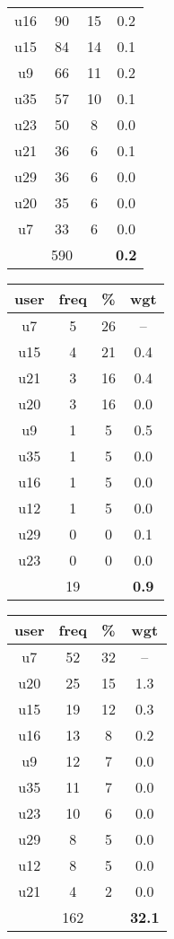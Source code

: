 \begin{appendices}
\begin{table}
\begin{tabular}{ |c|c|c|c| }
	u16 & 90 & 15 & 0.2 \\
	u15 & 84 & 14 & 0.1 \\
	u9 & 66 & 11 & 0.2 \\
	u35 & 57 & 10 & 0.1 \\
	u23 & 50 & 8 & 0.0 \\
	u21 & 36 & 6 & 0.1 \\
	u29 & 36 & 6 & 0.0 \\
	u20 & 35 & 6 & 0.0 \\
	u7 & 33 & 6 & 0.0 \\
	 & 590 & & \textbf{0.2} \\
	\hline
\end{tabular}
\begin{tabular}{ |c|c|c|c| }
	\hline
	\textbf{user} & \textbf{freq} & \textbf{\%} & \textbf{wgt} \\
	\hline
	u7 & 5 & 26 & -- \\
	u15 & 4 & 21 & 0.4 \\
	u21 & 3 & 16 & 0.4 \\
	u20 & 3 & 16 & 0.0 \\
	u9 & 1 & 5 & 0.5 \\
	u35 & 1 & 5 & 0.0 \\
	u16 & 1 & 5 & 0.0 \\
	u12 & 1 & 5 & 0.0 \\
	u29 & 0 & 0 & 0.1 \\
	u23 & 0 & 0 & 0.0 \\
	 & 19 & & \textbf{0.9} \\
	\hline
\end{tabular}
\begin{tabular}{ |c|c|c|c| }
	\hline
	\textbf{user} & \textbf{freq} & \textbf{\%} & \textbf{wgt} \\
	\hline
	u7 & 52 & 32 & -- \\
	u20 & 25 & 15 & 1.3 \\
	u15 & 19 & 12 & 0.3 \\
	u16 & 13 & 8 & 0.2 \\
	u9 & 12 & 7 & 0.0 \\
	u35 & 11 & 7 & 0.0 \\
	u23 & 10 & 6 & 0.0 \\
	u29 & 8 & 5 & 0.0 \\
	u12 & 8 & 5 & 0.0 \\
	u21 & 4 & 2 & 0.0 \\
	 & 162 & & \textbf{32.1} \\

\end{tabular}
\end{table}
\end{appendices}
